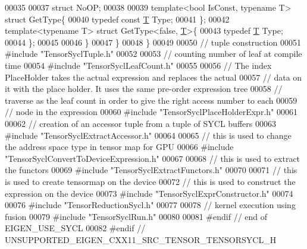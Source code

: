 \begin{DoxyCode}
00035 
00037   \textcolor{keyword}{struct }NoOP;
00038 
00039 \textcolor{keyword}{template}<\textcolor{keywordtype}{bool} IsConst, \textcolor{keyword}{typename} T> \textcolor{keyword}{struct }GetType\{
00040   \textcolor{keyword}{typedef} \textcolor{keyword}{const} \hyperlink{group___sparse_core___module_class_eigen_1_1_triplet}{T} Type;
00041 \};
00042 \textcolor{keyword}{template}<\textcolor{keyword}{typename} T> \textcolor{keyword}{struct }GetType<false, \hyperlink{group___sparse_core___module_class_eigen_1_1_triplet}{T}>\{
00043   \textcolor{keyword}{typedef} \hyperlink{group___sparse_core___module_class_eigen_1_1_triplet}{T} Type;
00044 \};
00045 
00046 \}
00047 \}
00048 \}
00049 
00050 \textcolor{comment}{// tuple construction}
00051 \textcolor{preprocessor}{#include "TensorSyclTuple.h"}
00052 
00053 \textcolor{comment}{// counting number of leaf at compile time}
00054 \textcolor{preprocessor}{#include "TensorSyclLeafCount.h"}
00055 
00056 \textcolor{comment}{// The index PlaceHolder takes the actual expression and replaces the actual}
00057 \textcolor{comment}{// data on it with the place holder. It uses the same pre-order expression tree}
00058 \textcolor{comment}{// traverse as the leaf count in order to give the right access number to each}
00059 \textcolor{comment}{// node in the expression}
00060 \textcolor{preprocessor}{#include "TensorSyclPlaceHolderExpr.h"}
00061 
00062 \textcolor{comment}{// creation of an accessor tuple from a tuple of SYCL buffers}
00063 \textcolor{preprocessor}{#include "TensorSyclExtractAccessor.h"}
00064 
00065 \textcolor{comment}{// this is used to change the address space type in tensor map for GPU}
00066 \textcolor{preprocessor}{#include "TensorSyclConvertToDeviceExpression.h"}
00067 
00068 \textcolor{comment}{// this is used to extract the functors}
00069 \textcolor{preprocessor}{#include "TensorSyclExtractFunctors.h"}
00070 
00071 \textcolor{comment}{// this is used to create tensormap on the device}
00072 \textcolor{comment}{// this is used to construct the expression on the device}
00073 \textcolor{preprocessor}{#include "TensorSyclExprConstructor.h"}
00074 
00076 \textcolor{preprocessor}{#include "TensorReductionSycl.h"}
00077 
00078 \textcolor{comment}{// kernel execution using fusion}
00079 \textcolor{preprocessor}{#include "TensorSyclRun.h"}
00080 
00081 \textcolor{preprocessor}{#endif  // end of EIGEN\_USE\_SYCL}
00082 \textcolor{preprocessor}{#endif  // UNSUPPORTED\_EIGEN\_CXX11\_SRC\_TENSOR\_TENSORSYCL\_H}
\end{DoxyCode}
